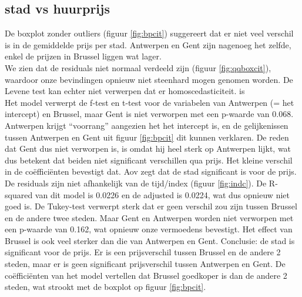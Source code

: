 \documentclass[a4paper,kulak]{kulakarticle} %
\begin{document}
\subsection{stad vs huurprijs}
\label{sec:stadvsprijs}
De boxplot zonder outliers (figuur \ref{fig:bpcit}) suggereert  dat er niet veel verschil is in de gemiddelde prijs per stad. Antwerpen en Gent zijn nagenoeg het zelfde, enkel de prijzen in Brussel liggen wat lager. \\
We zien dat de residuals niet normaal verdeeld zijn (figuur \ref{fig:qqboxcit}), waardoor onze bevindingen opnieuw niet steenhard mogen genomen worden. De Levene test kan echter niet verwerpen dat er homoscedasticiteit. is\\
Het model verwerpt de f-test en t-test voor de variabelen van Antwerpen (= het intercept) en Brussel, maar Gent is niet verworpen  met een p-waarde van 0.068. 
Antwerpen krijgt ``voorrang'' aangezien het het intercept is, en de gelijkenissen tussen Antwerpen en Gent uit figuur \ref*{fig:bpcit} dit kunnen verklaren. 
De reden dat Gent dus niet verworpen is, is omdat hij heel sterk op Antwerpen lijkt, wat dus betekent dat beiden niet significant verschillen qua prijs.
Het kleine verschil in de coëfficiënten bevestigt dat.
Aov zegt dat de stad significant is voor de prijs. 
De residuals zijn niet afhankelijk van de tijd/index (figuur \ref{fig:indc}).
De R-squared van dit model is 0.0226 en de adjusted is 0.0224, wat dus opnieuw niet goed is.
De Tukey-test verwerpt sterk dat er geen verschil zou zijn tussen Brussel en de andere twee steden. Maar Gent en Antwerpen worden niet verworpen  met een p-waarde van 0.162, wat opnieuw onze vermoedens bevestigt. 
Het effect van Brussel is ook veel sterker dan die van Antwerpen en Gent. 
Conclusie: de stad is significant voor de prijs. Er is een prijsverschil tussen Brussel en de andere 2 steden, maar er is geen significant prijsverschil tussen Antwerpen en Gent.
De coëfficiënten van het model vertellen dat Brussel goedkoper is dan de andere 2 steden, wat strookt met de boxplot op figuur \ref{fig:bpcit}.
\end{document}
